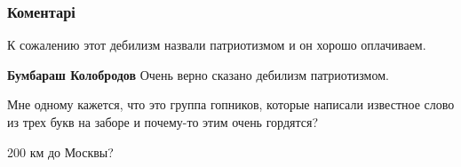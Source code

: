 
 
 
 
 
\subsubsection{Коментарі}

\begin{itemize}
 
К сожалению этот дебилизм назвали патриотизмом и он хорошо оплачиваем.

\begin{itemize}
 
\textbf{Бумбараш Колобродов} Очень верно сказано дебилизм патриотизмом.
\end{itemize}

 
Мне одному кажется, что это группа гопников, которые написали известное слово из трех букв на заборе и почему-то этим очень гордятся?

 
200 км до Москвы?

 

\end{itemize}

